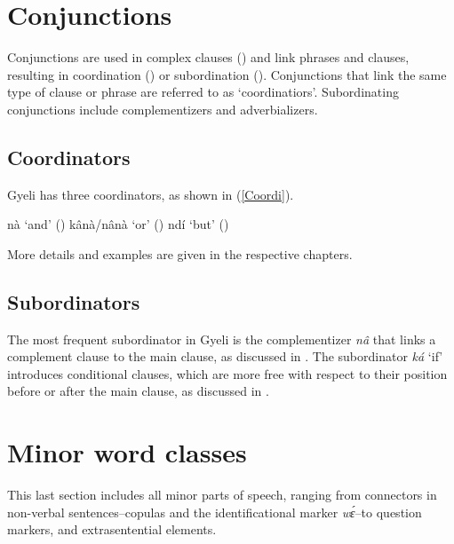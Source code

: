 \section{Conjunctions}
\label{sec:CONJ}

Conjunctions are used in complex clauses () and link phrases and clauses, resulting in coordination () or subordination (). Conjunctions that link the same type of clause or phrase are referred to as `coordinatiors'. Subordinating conjunctions include complementizers and adverbializers.

\subsection{Coordinators}
\label{sec:COORD}

Gyeli has three coordinators, as shown in (\ref{Coordi}).

\begin{exe}
\ex\label{Coordi}
\begin{xlist}
\ex\label{Coordi} nà `and' ()
\ex\label{Coordi} kânà/nânà `or' ()
\ex\label{Coordi} ndí `but' ()
\end{xlist}
\end{exe}

\noindent More details and examples are given in the respective chapters.




\subsection{Subordinators}
\label{sec:COMP}

The most frequent subordinator in Gyeli is the complementizer {\itshape nâ} that links a complement clause to the main clause, as discussed in . The subordinator {\itshape ká} `if' introduces conditional clauses, which are more free with respect to their position before or after the main clause, as discussed in .


\section{Minor word classes}
\label{sec:Others}

This last section includes all minor parts of speech, ranging from connectors in non-verbal sentences--copulas and the identificational marker {\itshape wɛ́}--to question markers, and extrasentential elements.

